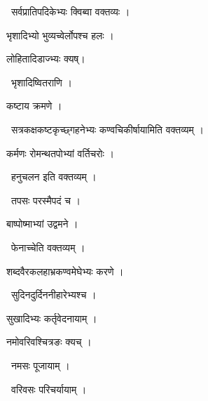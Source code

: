 \documentclass[10pt, openany, oneside]{book}
\begin{document}
\par\noindent\hspace{1.5em}{\vps वा॰}~{\qt सर्वप्रातिपदिकेभ्यः क्विब्वा वक्तव्यः ।}

\noindent भृशादिभ्यो भुव्यच्वेर्लोपश्च हलः ।

\noindent लोहितादिडाज्भ्यः क्यष्।

\par\noindent\hspace{1.5em}{\vps वा॰}~{\qt भृशादिष्वितराणि ।}

\noindent कष्टाय क्रमणे ।

\par\noindent\hspace{1.5em}{\vps वा॰}~{\qt सत्रकक्षकष्टकृच्छ्गहनेभ्यः कण्वचिकीर्षायामिति वक्तव्यम् ।}

\noindent कर्मणः रोमन्थतपोभ्यां वर्तिचरोः ।

\par\noindent\hspace{1.5em}{\vps वा॰}~{\qt हनुचलन इति वक्तव्यम् ।}

\par\noindent\hspace{1.5em}{\vps वा॰}~{\qt तपसः परस्मैपदं च ।}

\noindent बाष्पोष्माभ्यां उद्वमने ।

\par\noindent\hspace{1.5em}{\vps वा॰}~{\qt फेनाच्चेति वक्तव्यम् ।}

\noindent शब्दवैरकलहाभ्रकण्वमेघेभ्यः करणे ।

\par\noindent\hspace{1.5em}{\vps वा॰}~{\qt सुदिनदुर्दिननीहारेभ्यश्च ।}

\noindent सुखादिभ्यः कर्तृवेदनायाम् ।

\noindent नमोवरिवश्चित्रङः क्यच् ।

\par\noindent\hspace{1.5em}{\vps वा॰}~{\qt नमसः पूजायाम् ।}

\par\noindent\hspace{1.5em}{\vps वा॰}~{\qt वरिवसः परिचर्यायाम् ।}
\end{document}
